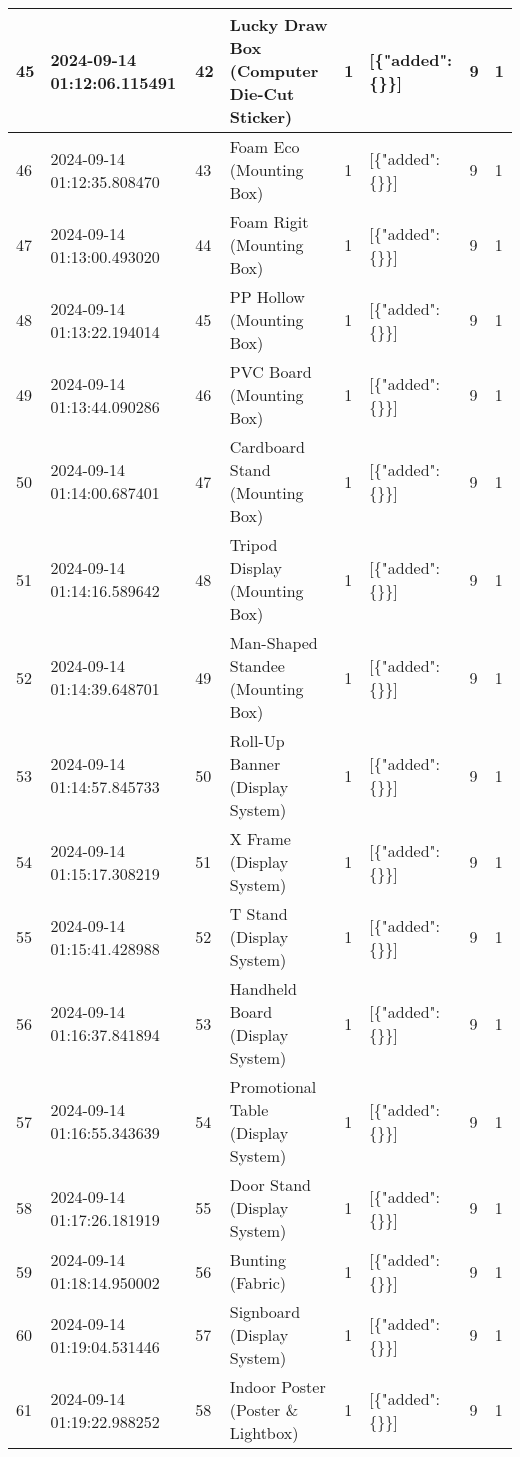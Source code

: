 \begin{longtable}{|l|l|l|l|l|l|l|l|}
45 & 2024-09-14 01:12:06.115491 & 42 & Lucky Draw Box (Computer Die-Cut Sticker) & 1 & [\{"added": \{\}\}] & 9 & 1 \\ \hline 
46 & 2024-09-14 01:12:35.808470 & 43 & Foam Eco (Mounting Box) & 1 & [\{"added": \{\}\}] & 9 & 1 \\ \hline 
47 & 2024-09-14 01:13:00.493020 & 44 & Foam Rigit (Mounting Box) & 1 & [\{"added": \{\}\}] & 9 & 1 \\ \hline 
48 & 2024-09-14 01:13:22.194014 & 45 & PP Hollow (Mounting Box) & 1 & [\{"added": \{\}\}] & 9 & 1 \\ \hline 
49 & 2024-09-14 01:13:44.090286 & 46 & PVC Board (Mounting Box) & 1 & [\{"added": \{\}\}] & 9 & 1 \\ \hline 
50 & 2024-09-14 01:14:00.687401 & 47 & Cardboard Stand (Mounting Box) & 1 & [\{"added": \{\}\}] & 9 & 1 \\ \hline 
51 & 2024-09-14 01:14:16.589642 & 48 & Tripod Display (Mounting Box) & 1 & [\{"added": \{\}\}] & 9 & 1 \\ \hline 
52 & 2024-09-14 01:14:39.648701 & 49 & Man-Shaped Standee (Mounting Box) & 1 & [\{"added": \{\}\}] & 9 & 1 \\ \hline 
53 & 2024-09-14 01:14:57.845733 & 50 & Roll-Up Banner (Display System) & 1 & [\{"added": \{\}\}] & 9 & 1 \\ \hline 
54 & 2024-09-14 01:15:17.308219 & 51 & X Frame (Display System) & 1 & [\{"added": \{\}\}] & 9 & 1 \\ \hline 
55 & 2024-09-14 01:15:41.428988 & 52 & T Stand (Display System) & 1 & [\{"added": \{\}\}] & 9 & 1 \\ \hline 
56 & 2024-09-14 01:16:37.841894 & 53 & Handheld Board (Display System) & 1 & [\{"added": \{\}\}] & 9 & 1 \\ \hline 
57 & 2024-09-14 01:16:55.343639 & 54 & Promotional Table (Display System) & 1 & [\{"added": \{\}\}] & 9 & 1 \\ \hline 
58 & 2024-09-14 01:17:26.181919 & 55 & Door Stand (Display System) & 1 & [\{"added": \{\}\}] & 9 & 1 \\ \hline 
59 & 2024-09-14 01:18:14.950002 & 56 & Bunting (Fabric) & 1 & [\{"added": \{\}\}] & 9 & 1 \\ \hline 
60 & 2024-09-14 01:19:04.531446 & 57 & Signboard (Display System) & 1 & [\{"added": \{\}\}] & 9 & 1 \\ \hline 
61 & 2024-09-14 01:19:22.988252 & 58 & Indoor Poster (Poster \& Lightbox) & 1 & [\{"added": \{\}\}] & 9 & 1 \\ \hline 

\end{longtable}
